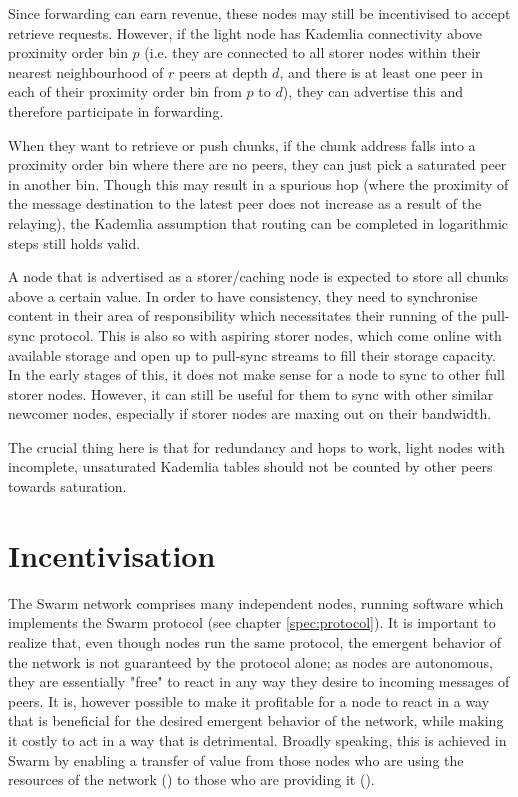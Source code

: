 Since forwarding can earn revenue, these nodes may still be incentivised to accept retrieve requests. However, if the light node has Kademlia connectivity above proximity order bin $p$ (i.e. they  are connected to all storer nodes within their nearest neighbourhood of $r$ peers at depth $d$, and there is at least one peer in each of their proximity order bin from $p$ to $d$), they can advertise this and therefore participate in forwarding. 

When they want to retrieve or push chunks, if the chunk address falls into a proximity order bin where there are no peers, they can just pick a saturated peer in another bin. Though this may result in a spurious hop (where the proximity of the message  destination to the latest peer does not increase as a result of the relaying), the Kademlia assumption that routing can be completed in logarithmic steps still holds valid.

A node that is advertised as a storer/caching node is expected to store all chunks  above a certain value. In order to have consistency, they need to synchronise content in their area of responsibility which necessitates their running of the pull-sync protocol. This is also so with aspiring storer nodes, which come online with available storage and open up to pull-sync streams to fill their storage capacity. In the early stages of this, it does not make sense for a node to sync to other full storer nodes. However, it can still be useful for them to sync with other similar newcomer nodes, especially if storer nodes are maxing out on their bandwidth.

The crucial thing here is that for redundancy and hops to work, light nodes with   incomplete, unsaturated Kademlia tables should not be counted by other peers towards saturation.


\chapter{Incentivisation}\label{sec:incentivisation}
The Swarm network comprises many independent nodes, running software which implements the Swarm protocol (see chapter \ref{spec:protocol}). It is important to realize that, even though nodes run the same protocol, the emergent behavior of the network is not guaranteed by the protocol alone; as nodes are autonomous, they are essentially "free" to react in any way they desire to incoming messages of peers.
It is, however possible to make it profitable for a node to react in a way that is beneficial for the desired emergent behavior of the network, while making it costly to act in a way that is detrimental. Broadly speaking, this is achieved in Swarm by enabling a transfer of value from those nodes who are using the resources of the network () to those who are providing it (). 


